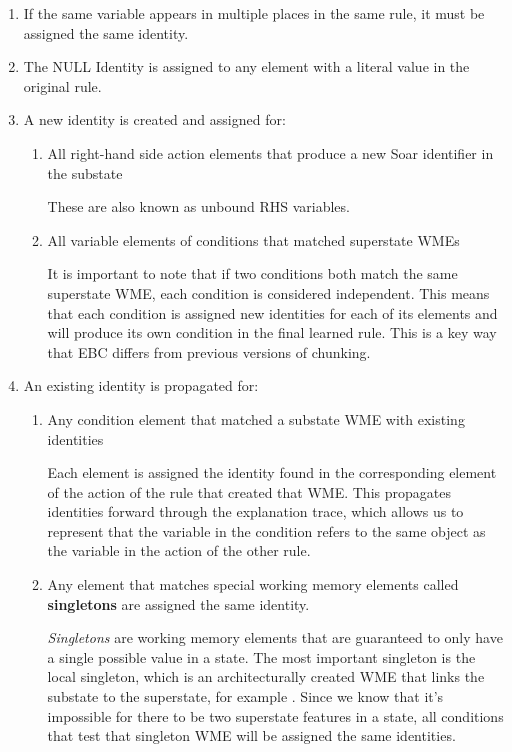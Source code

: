 \begin{enumerate}
	\item If the same variable appears in multiple places in the same rule, it must be assigned the same identity.

	\item The NULL Identity is assigned to any element with a literal value in the original rule.

	\item A new identity is created and assigned for:
	\begin{enumerate}
		\item All right-hand side action elements that produce a new Soar identifier in the substate

		These are also known as unbound RHS variables.

		\item All variable elements of conditions that matched superstate WMEs

		It is important to note that if two conditions both match the same superstate WME, each condition is considered independent.  This means that each condition is assigned new identities for each of its elements and will produce its own condition in the final learned rule.  This is a key way that EBC differs from previous versions of chunking.
	\end{enumerate}
	\item An existing identity is propagated for:

	\begin{enumerate}
		\item Any condition element that matched a substate WME with existing identities

		Each element is assigned the identity found in the corresponding element of the action of the rule that created that WME.  This propagates identities forward through the explanation trace, which allows us to represent that the variable in the condition refers to the same object as the variable in the action of the other rule.

		\item Any element that matches special working memory elements called \textbf{singletons} are assigned the same identity.

		\label{CHUNKING-singletons1}
		\textit{Singletons} are working memory elements that are guaranteed to only have a single possible value in a state.  The most important singleton is the local  singleton, which is an architecturally created WME that links the substate to the superstate, for example .  Since we know that it's impossible for there to be two superstate features in a state, all conditions that test that singleton WME will be assigned the same identities.


\end{enumerate}
\end{enumerate}
